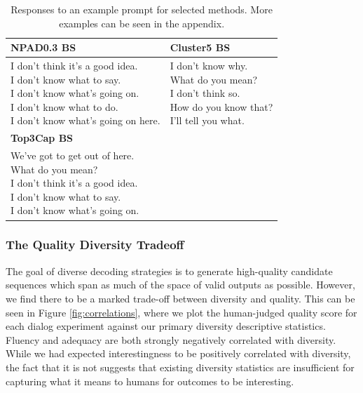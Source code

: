\begin{table}[t]
\begin{tabular}{|l|l|}
    \textbf{NPAD0.3 BS} & \textbf{Cluster5 BS} \\
    \hline
\makecell[l]{
I don't think it's a good idea. \\
I don't know what to say. \\
I don't know what's going on. \\
I don't know what to do. \\
I don't know what's going on here. \\
}&
\makecell[l]{
I don't know why. \\
What do you mean? \\
I don't think so. \\
How do you know that? \\
I'll tell you what. \\
}\\
\hline
\hline

\textbf{Top3Cap BS} & \\
\hline
\makecell[l]{
We've got to get out of here. \\
What do you mean? \\
I don't think it's a good idea. \\
I don't know what to say. \\
I don't know what's going on. \\
} & \\

\hline
    \end{tabular}
    \caption{Responses to an example prompt for selected methods. More examples can be seen in the appendix.}
    \label{examples}
\end{table}

\subsubsection{The Quality Diversity Tradeoff}

The goal of diverse decoding strategies is to generate high-quality candidate sequences which span as much of the space of valid outputs as possible. 
However, we find there to be a marked trade-off between diversity and quality.
This can be seen in Figure \ref{fig:correlations}, where we plot the human-judged quality score for each dialog experiment against our primary diversity descriptive statistics.
Fluency and adequacy are both strongly negatively correlated with diversity.
While we had expected interestingness to be positively correlated with diversity, the fact that it is not suggests that existing diversity statistics are insufficient for capturing what it means to humans for outcomes to be interesting.

